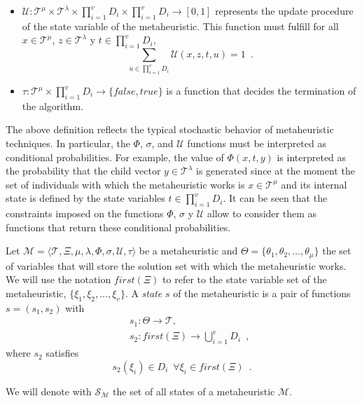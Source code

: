 \begin{definition}[Metaheuristic]
\begin{itemize}
		\item $\mathcal{U}: \mathcal{T}^\mu \times \mathcal{T}^\lambda \times \prod\limits_{i=1}^{v} D_i \times
		\prod\limits_{i=1}^{v} D_i \rightarrow [0,1]$ represents the update procedure of the state variable of the metaheuristic. This function must fulfill for all $x \in \mathcal{T}^{\mu}$, $z \in \mathcal{T}^{\lambda}$ y $t
		\in \prod_{i=1}^{v} D_i$,
		\begin{equation}
		\sum_{u \in \prod_{i=1}^{v} D_i} \mathcal{U} (x,z,t,u) = 1 \enspace .
		\end{equation}
		
		\item $\tau: \mathcal{T}^\mu \times \prod\limits_{i=1}^{v} D_i \rightarrow \{false, true\}$ is a function that decides the termination of the algorithm.
		
	\end{itemize}
\end{definition}

The above definition reflects the typical stochastic behavior of metaheuristic techniques. In particular, the
$\Phi$, $\sigma$, and $\mathcal{U}$ functions must be interpreted as conditional probabilities. For example, the value of $\Phi(x,t,y)$ is interpreted as the probability that the child vector $y \in \mathcal{T}^\lambda$ is generated since at the moment the set of individuals with which the metaheuristic works is $x \in \mathcal{T}^\mu$ and its internal state is defined by the state variables $t \in \prod_{i=1}^{v} D_i$. It can be seen that the constraints imposed on the functions $\Phi$, $\sigma$ y $\mathcal{U}$ allow to consider them as functions that return these conditional probabilities.

\begin{definition}
	\label{def:MetaheuristicState} Let $\mathcal{M} = \langle \mathcal{T}, \Xi, \mu, \lambda, \Phi, \sigma, \mathcal{U}, \tau \rangle$ be a metaheuristic and $\Theta = \{ \theta_1, \theta_2, \ldots, \theta_\mu\}$ the set of variables that will store the solution set with which the metaheuristic works. We will use the notation $first(\Xi)$ to refer to the state variable set of the metaheuristic, $\{\xi_1,\xi_2, \ldots, \xi_v\}$. A \emph{state} $s$ of the metaheuristic is a pair of functions $s=(s_1,s_2)$ with
	\begin{eqnarray}
	& & s_1: \Theta \rightarrow \mathcal{T}, \\
	& & s_2: first(\Xi) \rightarrow \bigcup\limits_{i=1}^{v} D_i \enspace ,
	\end{eqnarray}
	where $s_2$ satisfies
	\begin{equation}
	s_2(\xi_i) \in D_i \enspace \forall \xi_i \in first(\Xi) \enspace .
	\end{equation}
	
	We will denote with $\mathcal{S}_\mathcal{M}$ the set of all states of a metaheuristic $\mathcal{M}$.
\end{definition}

